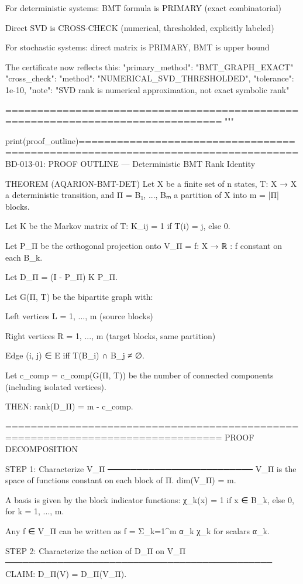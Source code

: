 For deterministic systems: BMT formula is PRIMARY (exact combinatorial)

Direct SVD is CROSS-CHECK (numerical, thresholded, explicitly labeled)

For stochastic systems: direct matrix is PRIMARY, BMT is upper bound


The certificate now reflects this:
"primary_method": "BMT_GRAPH_EXACT"
"cross_check": {
"method": "NUMERICAL_SVD_THRESHOLDED",
"tolerance": 1e-10,
"note": "SVD rank is numerical approximation, not exact symbolic rank"
}

================================================================================
"""

print(proof_outline)================================================================================
BD-013-01: PROOF OUTLINE — Deterministic BMT Rank Identity

THEOREM (AQARION-BMT-DET)
Let X be a finite set of n states, T: X → X a deterministic transition,
and Π = {B₁, ..., Bₘ} a partition of X into m = |Π| blocks.

Let K be the Markov matrix of T:
K_{ij} = 1 if T(i) = j, else 0.

Let P_Π be the orthogonal projection onto V_Π = {f: X → ℝ : f constant on each B_k}.

Let D_Π = (I - P_Π) K P_Π.

Let G(Π, T) be the bipartite graph with:

Left vertices L = {1, ..., m} (source blocks)

Right vertices R = {1, ..., m} (target blocks, same partition)

Edge (i, j) ∈ E iff T(B_i) ∩ B_j ≠ ∅.


Let c_comp = c_comp(G(Π, T)) be the number of connected components
(including isolated vertices).

THEN:
rank(D_Π) = m - c_comp.

================================================================================
PROOF DECOMPOSITION

STEP 1: Characterize V_Π
─────────────────────────
V_Π is the space of functions constant on each block of Π.
dim(V_Π) = m.

A basis is given by the block indicator functions:
χ_k(x) = 1 if x ∈ B_k, else 0,   for k = 1, ..., m.

Any f ∈ V_Π can be written as f = Σ_{k=1}^m α_k χ_k for scalars α_k.

STEP 2: Characterize the action of D_Π on V_Π
──────────────────────────────────────────────
CLAIM: D_Π(V) = D_Π(V_Π).

